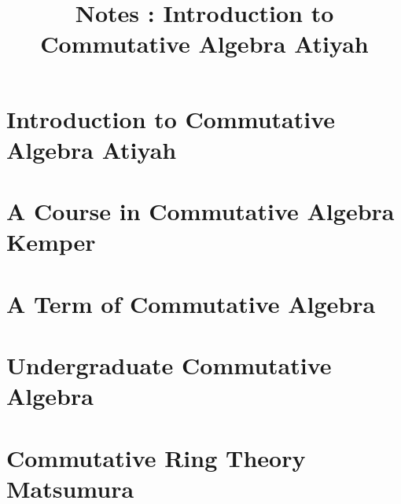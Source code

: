 \documentclass{article}
\title{Notes : Introduction to Commutative Algebra Atiyah}
\begin{document}
\tableofcontents
{}
\newpage\part{Introduction to Commutative Algebra Atiyah}
\newpage\part{A Course in Commutative Algebra Kemper}
\newpage\part{A Term of Commutative Algebra}
\newpage\part{Undergraduate Commutative Algebra}
\newpage\part{Commutative Ring Theory Matsumura}

\newpage

\end{document}
